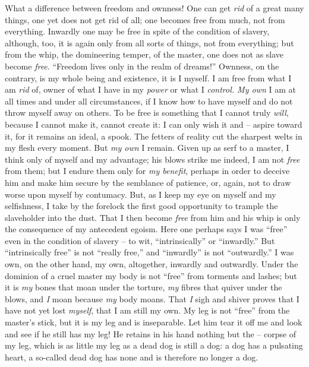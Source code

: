 \documentclass[12pt,a4paper]{book}
\begin{document}
What a difference between freedom and ownness! One can get \textit{rid} of a 
great many things, one yet does not get rid of all; one becomes free from 
much, not from everything. Inwardly one may be free in spite of the condition 
of slavery, although, too, it is again only from all sorts of things, not from 
everything; but from the whip, the domineering temper, of the master, one does 
not as slave become \textit{free}. ``Freedom lives only in the realm of 
dreams!'' Ownness, on the contrary, is my whole being and existence, it is I 
myself. I am free from what I am \textit{rid} of, owner of what I have in my 
\textit{power} or what I \textit{control. My own} I am at all times and under 
all circumstances, if I know how to have myself and do not throw myself away 
on others. To be free is something that I cannot truly \textit{will}, because 
I cannot make it, cannot create it: I can only wish it and -- aspire toward 
it, for it remains an ideal, a spook. The fetters of reality cut the sharpest 
welts in my flesh every moment. But \textit{my own} I remain. Given up as serf 
to a master, I think only of myself and my advantage; his blows strike me 
indeed, I am not \textit{free} from them; but I endure them only for 
\textit{my benefit}, perhaps in order to deceive him and make him secure by 
the semblance of patience, or, again, not to draw worse upon myself by 
contumacy. But, as I keep my eye on myself and my selfishness, I take by the 
forelock the first good opportunity to trample the slaveholder into the dust. 
That I then become \textit{free} from him and his whip is only the consequence 
of my antecedent egoism. Here one perhaps says I was ``free'' even in the 
condition of slavery -- to wit, ``intrinsically'' or ``inwardly.'' But 
``intrinsically free'' is not ``really free,'' and ``inwardly'' is not 
``outwardly.'' I was own, on the other hand, my own, altogether, inwardly 
and outwardly. Under the dominion of a cruel master my body is not ``free'' 
from torments and lashes; but it is \textit{my} bones that moan under the 
torture, \textit{my} fibres that quiver under the blows, and \textit{I} moan 
because \textit{my} body moans. That \textit{I} sigh and shiver proves that I 
have not yet lost \textit{myself}, that I am still my own. My leg is not 
``free'' from the master's stick, but it is my leg and is inseparable. Let 
him tear it off me and look and see if he still has my leg! He retains in his 
hand nothing but the -- corpse of my leg, which is as little my leg as a dead 
dog is still a dog: a dog has a pulsating heart, a so-called dead dog has none 
and is therefore no longer a dog.
\end{document}
